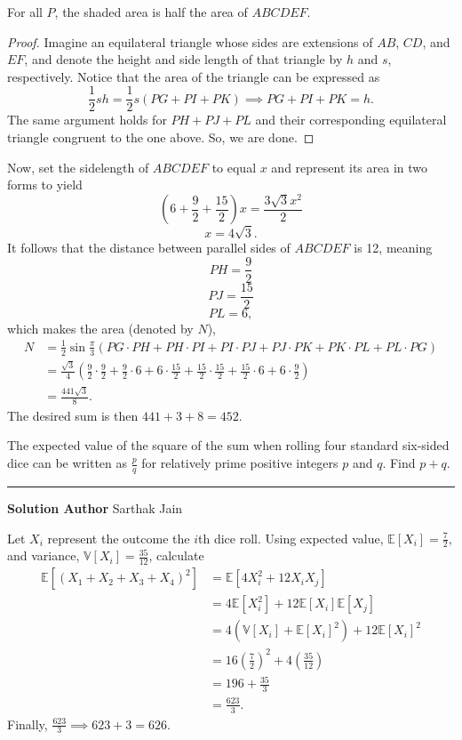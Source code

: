 \documentclass[11pt]{scrartcl}
\newcommand*{\problemfont}{\sffamily\bfseries}
\begin{document}
\begin{claim*}
    For all $P$, the shaded area is half the area of $ABCDEF$.
\end{claim*}
\begin{proof}
    Imagine an equilateral triangle whose sides are extensions of $AB$, $CD$, and $EF$, and denote the height and side length of that triangle by $h$ and $s$, respectively. Notice that the area of the triangle can be expressed as
    \[\frac{1}{2}sh = \frac{1}{2}s(PG + PI + PK) \implies PG + PI + PK = h.\]
    The same argument holds for $PH + PJ + PL$ and their corresponding equilateral triangle congruent to the one above. So, we are done.
\end{proof}
Now, set the sidelength of $ABCDEF$ to equal $x$ and represent its area in two forms to yield
\[\left(6 + \frac{9}{2} + \frac{15}{2}\right)x = \frac{3\sqrt{3}x^{2}}{2}\]
\[x = 4\sqrt{3}.\]
It follows that the distance between parallel sides of $ABCDEF$ is 12, meaning
\[PH = \frac{9}{2}\]
\[PJ = \frac{15}{2}\]
\[PL = 6,\]
which makes the area (denoted by $N$),
\begin{align*}
    N &= \frac{1}{2}\sin\frac{\pi}{3}(PG \cdot PH + PH \cdot PI + PI \cdot PJ + PJ \cdot PK + PK \cdot PL + PL \cdot PG) \\
    &= \frac{\sqrt{3}}{4}\left(\frac{9}{2} \cdot \frac{9}{2} + \frac{9}{2} \cdot 6 + 6 \cdot \frac{15}{2} + \frac{15}{2} \cdot \frac{15}{2} + \frac{15}{2} \cdot 6 + 6 \cdot \frac{9}{2}\right) \\
    &= \frac{441\sqrt{3}}{8}.
\end{align*}
The desired sum is then $441 + 3 + 8 = \boxed{452}$.

\pagebreak

\begin{problem}
    The expected value of the square of the sum when rolling four standard six-sided dice can be written as $\frac{p}{q}$ for relatively prime positive integers $p$ and $q$. Find $p + q$.
\end{problem}

\vspace{-\baselineskip}\rule{\textwidth}{0.4pt}

{\problemfont Solution Author} Sarthak Jain

Let $X_i$ represent the outcome the $i$th dice roll. Using expected value, $\mathbb{E}[X_i] = \frac{7}{2}$, and variance, $\mathbb{V}[X_i] = \frac{35}{12}$, calculate
\begin{align*}
    \mathbb{E}[(X_1 + X_2 + X_3 + X_4)^2] &= \mathbb{E}[4X_i^2 + 12X_iX_j] \\ 
    &= 4\mathbb{E}[X_i^2] + 12\mathbb{E}[X_i]\mathbb{E}[X_j] \\
    &= 4 \left(\mathbb{V}[X_i] + \mathbb{E}[X_i]^2 \right) + 12\mathbb{E}[X_i]^2 \\
    &= 16\left(\frac{7}{2}\right)^2 + 4\left(\frac{35}{12}\right) \\
    &= 196 + \frac{35}{3} \\
    &= \frac{623}{3}.
\end{align*}
Finally, $\frac{623}{3} \implies 623 + 3 = \boxed{626}$.
\end{document}
